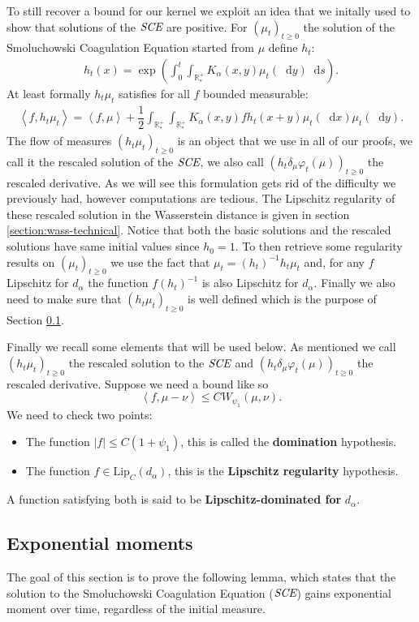 \documentclass[11pt,a4paper]{article}
\newcommand{\RRP}{\mathbb{R}^+_*}
\newcommand{\SCE}{\emph{SCE}}
\newcommand{\Proc}[1]{\left(#1\right)_{t\geq 0}}
\newcommand{\brac}[1]{\left\langle#1\right\rangle}
\newcommand{\dd}{\mathop{}\!\mathrm{d}}
\begin{document}
To still recover a bound for our kernel we exploit an idea that we initally used to show that solutions of the $\SCE$ are positive. For $\Proc{\mu_t}$ the solution of the Smoluchowski Coagulation Equation  started from $\mu$ define $h_t$:
\begin{align*}
    h_t(x) = \exp\left(\int_0^t\int_{\RRP} K_\alpha(x,y) \mu_t(\dd y)\dd s\right).
\end{align*}
At least formally $h_t\mu_t$ satisfies for all $f$ bounded measurable:
\begin{align*}
    \brac{f,h_t\mu_t} = \brac{f,\mu} + \dfrac{1}{2}\int_{\RRP} \int_{\RRP} K_\alpha(x,y) fh_t(x+y) \mu_t(\dd x) \mu_t (\dd y) .
\end{align*}
The flow of measures $\Proc{h_t\mu_t}$ is an object that we use in all of our proofs, we call it the rescaled solution of the $\SCE$, we also call $\Proc{h_t\delta_{\mu}\varphi_t(\mu)}$ the rescaled derivative. As we will see this formulation gets rid of the difficulty we previously had, however computations are tedious. The Lipschitz regularity of these rescaled solution in the Wasserstein distance is given in section \ref{section:wass-technical}. Notice that both the basic solutions and the rescaled solutions have same initial values since $h_0 = 1$. To then retrieve some regularity results on $\Proc{\mu_t}$ we use the fact that $\mu_t = (h_t)^{-1}h_t \mu_t$ and, for any $f$ Lipschitz for $d_\alpha$ the function $f(h_t)^{-1}$ is also Lipschitz for $d_\alpha$. Finally we also need to make sure that $\Proc{h_t\mu_t}$ is well defined which is the purpose of Section \ref{section:wass-exponential}.

Finally we recall some elements that will be used below. As mentioned we call $\Proc{h_t\mu_t}$ the rescaled solution to the $\SCE$ and $\Proc{h_t\delta_{\mu}\varphi_t(\mu)}$ the rescaled derivative. Suppose we need a bound like so
\[\brac{f,\mu-\nu} \leq C W_{\psi_1}(\mu,\nu).\]
We need to check two points:
\begin{itemize}
    \item The function $|f| \leq C(1 + \psi_1)$, this is called the \textbf{domination} hypothesis.
    \item The function $f \in \text{Lip}_C(d_\alpha)$, this is the \textbf{Lipschitz regularity} hypothesis.
\end{itemize}
A function satisfying both is said to be \textbf{Lipschitz-dominated for} $d_\alpha$.

\subsection{Exponential moments}\label{section:wass-exponential}
The goal of this section is to prove the following lemma, which states that the solution to the Smoluchowski Coagulation Equation ($\SCE$) gains exponential moment over time, regardless of the initial measure.
\end{document}
